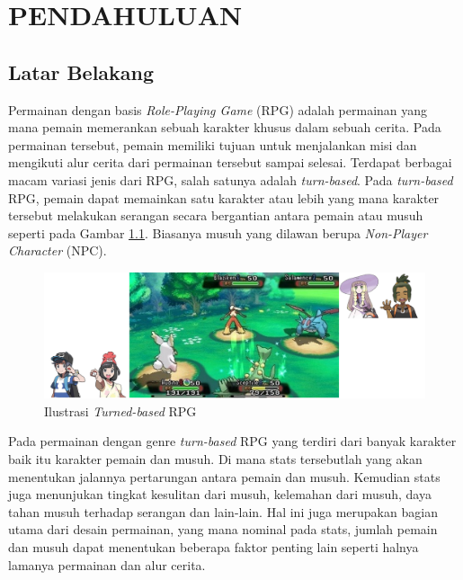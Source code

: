 \chapter{PENDAHULUAN}
\vspace{4ex}

\section{Latar Belakang}
\vspace{1ex}

Permainan dengan basis \textit{Role-Playing Game} (RPG) adalah permainan yang mana pemain memerankan sebuah karakter khusus dalam sebuah cerita. Pada permainan tersebut, pemain memiliki tujuan untuk menjalankan misi dan mengikuti alur cerita dari permainan tersebut sampai selesai. Terdapat berbagai macam variasi jenis dari RPG, salah satunya adalah \textit{turn-based}. Pada \textit{turn-based} RPG, pemain dapat memainkan satu karakter atau lebih yang mana karakter tersebut melakukan serangan secara bergantian antara pemain atau musuh seperti pada Gambar \ref{fig:rpg_turn_based}. Biasanya musuh yang dilawan berupa \textit{Non-Player Character} (NPC).
\vspace{1ex}

\begin{figure} [!h] \centering
	\includegraphics[scale=0.40]{img/turn_based.png}
	\caption{Ilustrasi \textit{Turned-based} RPG}
	\label{fig:rpg_turn_based}
\end{figure}

Pada permainan dengan genre \textit{turn-based} RPG yang terdiri dari banyak karakter baik itu karakter pemain dan musuh. Di mana stats tersebutlah yang akan menentukan jalannya pertarungan antara pemain dan musuh. Kemudian stats juga menunjukan tingkat kesulitan dari musuh, kelemahan dari musuh, daya tahan musuh terhadap serangan dan lain-lain. Hal ini juga merupakan bagian utama dari desain permainan, yang mana nominal pada stats, jumlah pemain dan musuh dapat menentukan beberapa faktor penting lain seperti halnya lamanya permainan dan alur cerita. 
\vspace{1ex}

